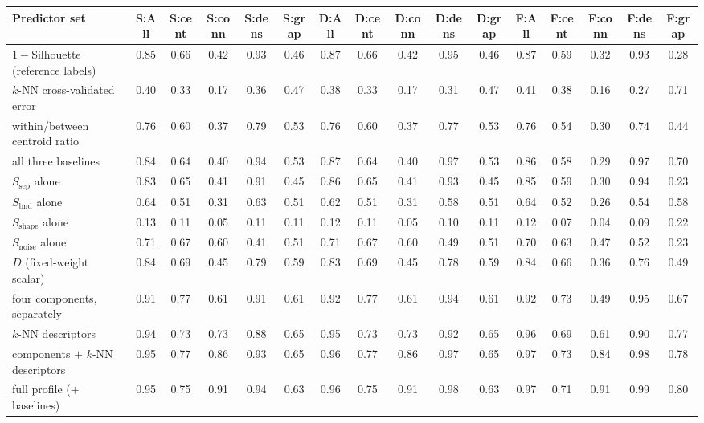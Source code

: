 \begin{tabular}{@{}lccccccccccccccc@{}}
\toprule
Predictor set & S:All & S:cent & S:conn & S:dens & S:grap & D:All & D:cent & D:conn & D:dens & D:grap & F:All & F:cent & F:conn & F:dens & F:grap \\
\midrule
$1-$Silhouette (reference labels) & 0.85 & 0.66 & 0.42 & 0.93 & 0.46 & 0.87 & 0.66 & 0.42 & 0.95 & 0.46 & 0.87 & 0.59 & 0.32 & 0.93 & 0.28 \\
$k$-NN cross-validated error & 0.40 & 0.33 & 0.17 & 0.36 & 0.47 & 0.38 & 0.33 & 0.17 & 0.31 & 0.47 & 0.41 & 0.38 & 0.16 & 0.27 & 0.71 \\
within/between centroid ratio & 0.76 & 0.60 & 0.37 & 0.79 & 0.53 & 0.76 & 0.60 & 0.37 & 0.77 & 0.53 & 0.76 & 0.54 & 0.30 & 0.74 & 0.44 \\
all three baselines & 0.84 & 0.64 & 0.40 & 0.94 & 0.53 & 0.87 & 0.64 & 0.40 & 0.97 & 0.53 & 0.86 & 0.58 & 0.29 & 0.97 & 0.70 \\
$S_{\text{sep}}$ alone & 0.83 & 0.65 & 0.41 & 0.91 & 0.45 & 0.86 & 0.65 & 0.41 & 0.93 & 0.45 & 0.85 & 0.59 & 0.30 & 0.94 & 0.23 \\
$S_{\text{bnd}}$ alone & 0.64 & 0.51 & 0.31 & 0.63 & 0.51 & 0.62 & 0.51 & 0.31 & 0.58 & 0.51 & 0.64 & 0.52 & 0.26 & 0.54 & 0.58 \\
$S_{\text{shape}}$ alone & 0.13 & 0.11 & 0.05 & 0.11 & 0.11 & 0.12 & 0.11 & 0.05 & 0.10 & 0.11 & 0.12 & 0.07 & 0.04 & 0.09 & 0.22 \\
$S_{\text{noise}}$ alone & 0.71 & 0.67 & 0.60 & 0.41 & 0.51 & 0.71 & 0.67 & 0.60 & 0.49 & 0.51 & 0.70 & 0.63 & 0.47 & 0.52 & 0.23 \\
$D$ (fixed-weight scalar) & 0.84 & 0.69 & 0.45 & 0.79 & 0.59 & 0.83 & 0.69 & 0.45 & 0.78 & 0.59 & 0.84 & 0.66 & 0.36 & 0.76 & 0.49 \\
four components, separately & 0.91 & 0.77 & 0.61 & 0.91 & 0.61 & 0.92 & 0.77 & 0.61 & 0.94 & 0.61 & 0.92 & 0.73 & 0.49 & 0.95 & 0.67 \\
$k$-NN descriptors & 0.94 & 0.73 & 0.73 & 0.88 & 0.65 & 0.95 & 0.73 & 0.73 & 0.92 & 0.65 & 0.96 & 0.69 & 0.61 & 0.90 & 0.77 \\
components $+$ $k$-NN descriptors & 0.95 & 0.77 & 0.86 & 0.93 & 0.65 & 0.96 & 0.77 & 0.86 & 0.97 & 0.65 & 0.97 & 0.73 & 0.84 & 0.98 & 0.78 \\
full profile ($+$ baselines) & 0.95 & 0.75 & 0.91 & 0.94 & 0.63 & 0.96 & 0.75 & 0.91 & 0.98 & 0.63 & 0.97 & 0.71 & 0.91 & 0.99 & 0.80 \\
\bottomrule
\end{tabular}
